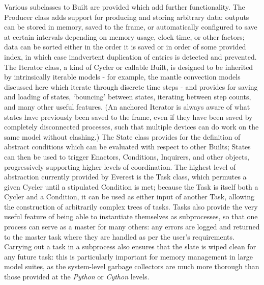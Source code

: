 \documentclass[a4paper,11pt,oneside]{book}
\begin{document}
Various subclasses to Built are provided which add further functionality. The Producer class adds support for producing and storing arbitrary data: outputs can be stored in memory, saved to the frame, or automatically configured to save at certain intervals depending on memory usage, clock time, or other factors; data can be sorted either in the order it is saved or in order of some provided index, in which case inadvertent duplication of entries is detected and prevented. The Iterator class, a kind of Cycler or callable Built, is designed to be inherited by intrinsically iterable models - for example, the mantle convection models discussed here which iterate through discrete time steps - and provides for saving and loading of states, `bouncing' between states, iterating between step counts, and many other useful features. (An anchored Iterator is always aware of what states have previously been saved to the frame, even if they have been saved by completely disconnected processes, such that multiple devices can do work on the same model without clashing.) The State class provides for the definition of abstract conditions which can be evaluated with respect to other Builts; States can then be used to trigger Enactors, Conditions, Inquirers, and other objects, progressively supporting higher levels of coordination. The highest level of abstraction currently provided by Everest is the Task class, which permutes a given Cycler until a stipulated Condition is met; because the Task is itself both a Cycler and a Condition, it can be used as either input of another Task, allowing the construction of arbitrarily complex trees of tasks. Tasks also provide the very useful feature of being able to instantiate themselves as subprocesses, so that one process can serve as a master for many others: any errors are logged and returned to the master task where they are handled as per the user's requirements. Carrying out a task in a subprocess also ensures that the slate is wiped clean for any future task: this is particularly important for memory management in large model suites, as the system-level garbage collectors are much more thorough than those provided at the \textit{Python} or \textit{Cython} levels.
\end{document}
